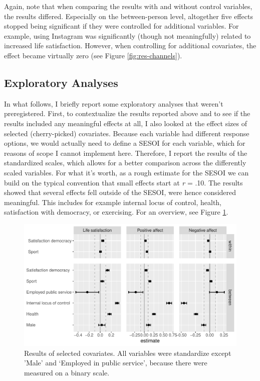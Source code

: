 \documentclass[
  english,
  man,floatsintext]{apa6}
\begin{document}
Again, note that when comparing the results with and without control variables, the results differed.
Especially on the between-person level, altogether five effects stopped being significant if they were controlled for additional variables.
For example, using Instagram was significantly (though not meaningfully) related to increased life satisfaction.
However, when controlling for additional covariates, the effect became virtually zero (see Figure \ref{fig:res-channels}).

\hypertarget{exploratory-analyses}{%
\subsection{Exploratory Analyses}\label{exploratory-analyses}}

In what follows, I briefly report some exploratory analyses that weren't preregistered.
First, to contextualize the results reported above and to see if the results included any meaningful effects at all, I also looked at the effect sizes of selected (cherry-picked) covariates.
Because each variable had different response options, we would actually need to define a SESOI for each variable, which for reasons of scope I cannot implement here.
Therefore, I report the results of the standardized scales,
which allows for a better comparison across the differently scaled variables.
For what it's worth, as a rough estimate for the SESOI we can build on the typical convention that small effects start at \emph{r} = \textbar.10\textbar.
The results showed that several effects fell outside of the SESOI, were hence considered meaningful.
This includes for example internal locus of control, health, satisfaction with democracy, or exercising.
For an overview, see Figure \ref{fig:res-control}.

\begin{figure}
\includegraphics[width=\textwidth]{figures/fig_results_control_std} \caption{Results of selected covariates. All variables were standardize except 'Male'  and ‘Employed in public service', because there were measured on a binary scale.}\label{fig:res-control}
\end{figure}
\end{document}
